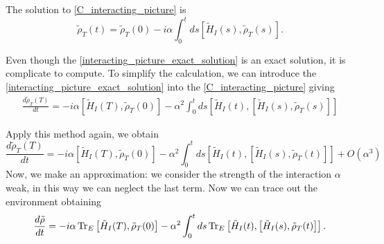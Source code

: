 The solution to \eqref{C_interacting_picture} is 
\begin{equation}\label{interacting_picture_exact_solution}
    \tilde\rho_T(t) = \tilde\rho_T(0) -i\alpha\int_{0}^{t}ds\left[\tilde H_I(s),\tilde\rho_T(s)\right].
\end{equation}

Even though the \eqref{interacting_picture_exact_solution} is an exact solution, it is complicate to compute. To simplify the calculation, we can introduce the \eqref{interacting_picture_exact_solution} into the \eqref{C_interacting_picture} giving
\begin{eqnarray}
    \frac{d\tilde\rho_T(T)}{dt}= -i\alpha\left[\tilde H_I(T),\tilde\rho_T(0)\right] -\alpha^2 \int_{0}^{t}ds\left[\tilde H_I(t),\left[\tilde H_I(s),\tilde\rho_T(s)\right]\right]
\end{eqnarray}

Apply this method again, we obtain
\begin{equation}
    \frac{d\tilde\rho_T(T)}{dt}= -i\alpha\left[\tilde H_I(T),\tilde\rho_T(0)\right] -\alpha^2 \int_{0}^{t}ds\left[\tilde H_I(t),\left[\tilde H_I(s),\tilde\rho_T(t)\right]\right] + O(\alpha^3)
\end{equation}
Now, we make an approximation: we consider the strength of the interaction $\alpha$ weak, in this way we can neglect the last term.
Now we can trace out the environment obtaining
\begin{equation}\label{trace_C_interacting_picture}
    \frac{d\tilde\rho}{dt} = -i\alpha\operatorname{Tr}_E\left[\tilde H_I(T),\tilde\rho_T(0)\right] -\alpha^2 \int_{0}^{t}ds \operatorname{Tr}_E\left[\tilde H_I(t),\left[\tilde H_I(s),\tilde\rho_T(t)\right]\right].
\end{equation}

